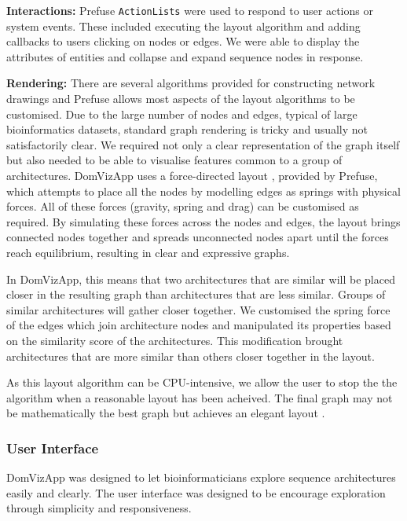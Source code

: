 \textbf{Interactions:} Prefuse \texttt{ActionLists} were used to respond to user actions or system events. These included executing the layout algorithm and adding callbacks to users clicking on nodes or edges. We were able to display the attributes of entities and collapse and expand sequence nodes in response.

\textbf{Rendering:} There are several algorithms provided for constructing network drawings and Prefuse allows most aspects of the layout algorithms to be customised. Due to the large number of nodes and edges, typical of large bioinformatics datasets, standard graph rendering is tricky and usually not satisfactorily clear. We required not only a clear representation of the graph itself but also needed to be able to visualise features common to a group of architectures. DomVizApp uses a force-directed layout \cite{force}, provided by Prefuse, which attempts to place all the nodes by modelling edges as springs with physical forces. All of these forces (gravity, spring and drag) can be customised as required. By simulating these forces across the nodes and edges, the layout brings connected nodes together and spreads unconnected nodes apart until the forces reach equilibrium, resulting in clear and expressive graphs. 

In DomVizApp, this means that two architectures that are similar will be placed closer in the resulting graph than architectures that are less similar. Groups of similar architectures will gather closer together. We customised the spring force of the edges which join architecture nodes and manipulated its properties based on the similarity score of the architectures. This modification brought architectures that are more similar than others closer together in the layout.

As this layout algorithm can be CPU-intensive, we allow the user to stop the the algorithm when a reasonable layout has been acheived. The final graph may not be mathematically the best graph but achieves an elegant layout \cite{force}.

\subsubsection{User Interface}
DomVizApp was designed to let bioinformaticians explore sequence architectures easily and clearly. The user interface was designed to be encourage exploration through simplicity and responsiveness.

